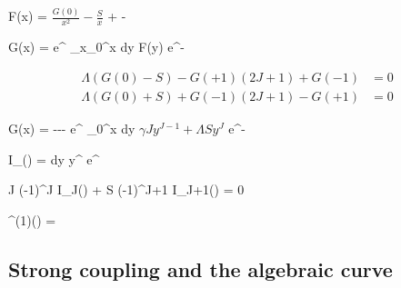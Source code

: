 \beq
	F(x) = \( \frac{G(0)}{x^2} - \frac{S}{x} \) +  - 
\eeq

\beq
	G(x) =  e^{\Lambda {}} \int_{x_0}^x dy \; F(y)  e^{-\Lambda {}}
\eeq

\begin{subequations}
  \begin{align}
	\Lambda(G(0)-S) - G(+1)(2J+1)+G(-1) &= 0 \\
	\Lambda(G(0)+S) + G(-1)(2J+1)-G(+1) &= 0
  \end{align}
\end{subequations}

\beq
G(x) = ---  e^{\Lambda {}} \int_0^x dy \( \gamma J y^{J-1} + \Lambda S y^J \) e^{-\Lambda {}}
\eeq

\beq
	I_\nu(\Lambda) =  \oint dy \; y^{} e^{\Lambda {}}
\eeq

\beq
	\gamma J (-1)^J I_J(\Lambda) + \Lambda S (-1)^{J+1} I_{J+1}(\Lambda) = 0
\eeq

\beq
	\gamma^{(1)}(\Lambda) =  
\eeq

\subsection{Strong coupling and the algebraic curve}



